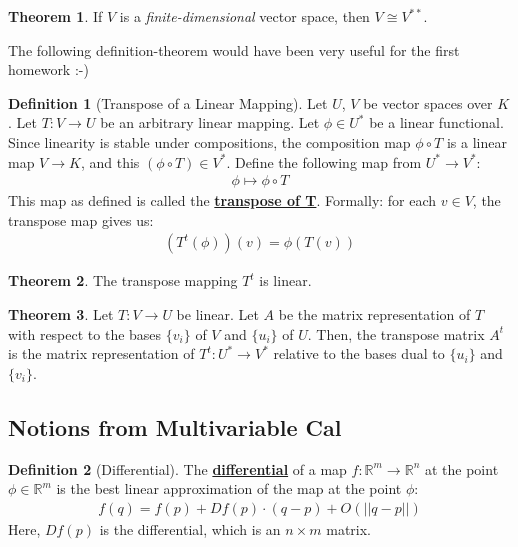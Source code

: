 \documentclass[11pt]{scrartcl}
\newcommand{\R}[0]{\mathbb{R}}
\theoremstyle{definition}
\newtheorem{theorem}{Theorem}
\newtheorem{definition}{Definition}
\theoremstyle{remark}
\newcommand{\dfn}[1]{\textbf{\underline{#1}}}
\begin{document}
{\begin{theorem}
	If $V$ is a \emph{finite-dimensional} vector space, then $V \cong V^{**}$. 
\end{theorem}

The following definition-theorem would have been very useful for the first homework :-) 

\begin{definition}[Transpose of a Linear Mapping] 
	Let $U$, $V$ be vector spaces over $K$. Let $T: V \rightarrow U$ be an arbitrary linear mapping. Let $\phi \in U^*$ be a linear functional. Since linearity is stable under compositions, the composition map $\phi \circ T$ is a linear map $V \rightarrow K$, and this $(\phi \circ T) \in V^*$. Define the following map from $U^* \rightarrow V^*$: 
	\begin{align*}
		\phi \mapsto \phi \circ T 
	\end{align*}
	This map as defined is called the \dfn{transpose of T}. Formally: for each $v \in V$, the transpose map gives us: 
	\begin{align}
		(T^t(\phi))(v) = \phi(T(v)) 	
	\end{align}
\end{definition}


\begin{theorem}
	The transpose mapping $T^t$ is linear. 
\end{theorem}
\begin{theorem}
	Let $T: V \rightarrow U$ be linear. Let $A$ be the matrix representation of $T$ with respect to the bases $\{v_i \}$ of $V$ and $\{ u_i \}$ of $U$. Then, the transpose matrix $A^t$ is the matrix representation of $T^t : U^* \rightarrow V^*$ relative to the bases dual to $\{ u_i \}$ and $\{ v_i \}$. 
\end{theorem}


\subsection{Notions from Multivariable Cal}
\begin{definition}[Differential]
	The \dfn{differential} of a map $f: \R^m \rightarrow \R^n$ at the point $\phi \in \R^m$ is the best linear approximation of the map at the point $\phi$: 
	\begin{align}
		f(q) = f(p) + Df(p) \cdot (q-p) + O(||q-p||) 	
	\end{align}
	Here, $Df(p)$ is the differential, which is an $n \times m$ matrix. 
\end{definition}

}
\end{document}
